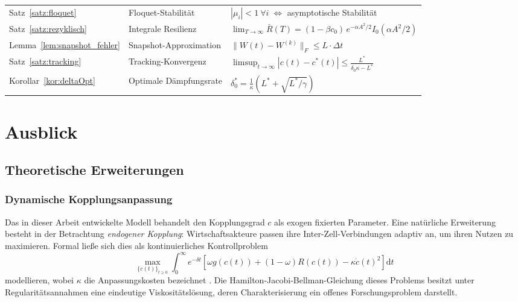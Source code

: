 ﻿\documentclass[a4paper,12pt]{article}
\theoremstyle{definition}
\begin{document}
\begin{table}[H]
\begin{tabular}{llp{7.0cm}}
Satz~\ref{satz:floquet}     & Floquet-Stabilität        & $|\mu_i|<1\ \forall i\;\Leftrightarrow$ asymptotische Stabilität \\
Satz~\ref{satz:rezyklisch}  & Integrale Resilienz       & $\lim_{T\to\infty}\bar{R}(T)=(1-\beta c_0)\,e^{-\alpha A^2/2}I_0(\alpha A^2/2)$ \\
Lemma~\ref{lem:snapshot_fehler} & Snapshot-Approximation & $\|W(t)-W^{(k)}\|_F\leq L\cdot\Delta t$ \\
Satz~\ref{satz:tracking}    & Tracking-Konvergenz       & $\limsup_{t\to\infty}|c(t)-c^*(t)|\leq\frac{L^*}{\delta_0\kappa-L^*}$ \\
Korollar~\ref{kor:deltaOpt} & Optimale Dämpfungsrate    & $\delta_0^*=\frac{1}{\kappa}(L^*+\sqrt{L^*/\gamma})$ \\
\bottomrule
\end{tabular}
\end{table}

\section{Ausblick}

\subsection{Theoretische Erweiterungen}

\subsubsection{Dynamische Kopplungsanpassung}

Das in dieser Arbeit entwickelte Modell behandelt den Kopplungsgrad $c$ als exogen fixierten
Parameter. Eine natürliche Erweiterung besteht in der Betrachtung \emph{endogener Kopplung}:
Wirtschaftsakteure passen ihre Inter-Zell-Verbindungen adaptiv an, um ihren Nutzen zu maximieren.
Formal ließe sich dies als kontinuierliches Kontrollproblem
\[
    \max_{\{c(t)\}_{t\geq 0}} \int_0^\infty e^{-\delta t}
    \left[\omega g(c(t)) + (1-\omega) R(c(t)) - \kappa \dot{c}(t)^2\right] \mathrm{d}t
\]
modellieren, wobei $\kappa$ die Anpassungskosten bezeichnet \citep{caballero2009alchemy}.
Die Hamilton-Jacobi-Bellman-Gleichung dieses Problems besitzt unter Regularitätsannahmen
eine eindeutige Viskositätslösung, deren Charakterisierung ein offenes Forschungsproblem darstellt.
\end{document}
